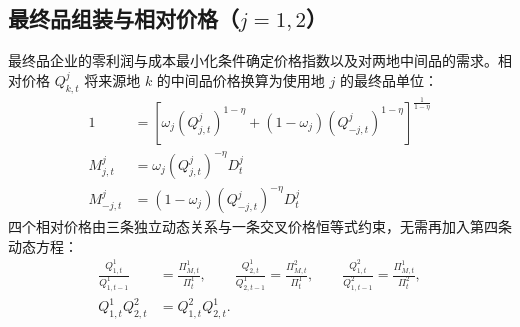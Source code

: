 \documentclass[12pt,UTF8]{ctexart}
\begin{document}
	\subsection{最终品组装与相对价格（\texorpdfstring{$j=1,2$}{j=1,2}）}
	最终品企业的零利润与成本最小化条件确定价格指数以及对两地中间品的需求。相对价格 $Q_{k,t}^j$ 将来源地 $k$ 的中间品价格换算为使用地 $j$ 的最终品单位：
	\begin{align}
		1 &=\left[ \omega_j(Q_{j,t}^j)^{1-\eta} +(1-\omega_j)(Q_{-j,t}^j)^{1-\eta} \right]^{\frac{1}{1-\eta}} \label{a13}\\
		M_{j,t}^j &=\omega_j(Q_{j,t}^j)^{-\eta}D_t^j \label{a14}\\
		M_{-j,t}^j &=(1-\omega_j)(Q_{-j,t}^j)^{-\eta}D_t^j \label{a15}
	\end{align}
	四个相对价格由三条独立动态关系与一条交叉价格恒等式约束，无需再加入第四条动态方程：
	\begin{align}
		\frac{Q_{1,t}^1}{Q_{1,t-1}^1}&=\frac{\Pi_{M,t}^1}{\Pi_t^1},\qquad
		\frac{Q_{2,t}^1}{Q_{2,t-1}^1}=\frac{\Pi_{M,t}^2}{\Pi_t^1},\qquad
		\frac{Q_{1,t}^2}{Q_{1,t-1}^2}=\frac{\Pi_{M,t}^1}{\Pi_t^2}, \label{a16}\\
		Q_{1,t}^1Q_{2,t}^2&=Q_{1,t}^2Q_{2,t}^1. \label{a16q}
	\end{align}
	
\end{document}
